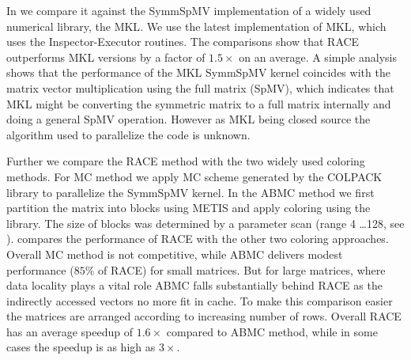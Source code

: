 In  we compare it against the \acrshort{SymmSpMV} 
implementation of a widely used numerical library, the \acrshort{MKL}. 
We use the latest implementation of MKL, which uses the Inspector-Executor routines.
The comparisons show that \acrshort{RACE} outperforms MKL
versions by a factor of $1.5\times$ on an average. A simple analysis
shows that the performance of the \acrshort{MKL} \acrshort{SymmSpMV} 
kernel coincides with the matrix vector multiplication using the full
matrix (\acrshort{SpMV}), which indicates that MKL might be converting
the symmetric matrix to a full matrix internally and doing a general \acrshort{SpMV}
operation. However as MKL being closed source  the algorithm 
used to parallelize the code is unknown.

Further we compare the \acrshort{RACE} method with the two widely used
coloring methods. For \acrshort{MC} method we apply \acrlong{MC} scheme
generated by the COLPACK \cite{COLPACK} library to parallelize the \acrshort{SymmSpMV}
kernel. In the \acrshort{ABMC} method we first partition the matrix into blocks
using METIS \cite{METIS} and apply coloring using the \COLPACK library. The
size of blocks was determined by a parameter scan (range 4 \ldots 128, see \cite{ABMC}).
 compares the performance of \acrshort{RACE} with the other 
two coloring approaches.
Overall \acrshort{MC} method is not competitive, while \acrshort{ABMC} delivers
modest performance ($85 \%$ of \acrshort{RACE}) for small matrices. But for large
matrices,  where data locality plays a vital role \acrshort{ABMC} 
falls substantially behind \acrshort{RACE} as the indirectly
accessed vectors no more fit in cache. To make this comparison easier
the matrices are arranged according to increasing number of rows.
Overall \acrshort{RACE} has an average speedup of $1.6\times$ compared to 
\acrshort{ABMC} method, while in some cases the speedup is as high as $3\times$.





